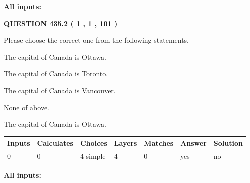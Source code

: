 \documentclass[12pt]{article}
\begin{document}
   
   
   
\noindent{}
   
   
   
   
\noindent\vspace{0.1in}\hspace{-0.08in} {\textbf{\Large{All inputs: }}}
   
   
  
\vspace{0.2in}
  
{\textbf{\Large{QUESTION
435.2 
 ( 1 , 1 , 101 )
}}}
  
  
Please choose the correct one from the following statements.
 
 
The capital of Canada is Ottawa.
 
 
The capital of Canada is Toronto.
 
 
The capital of Canada is Vancouver.
 
 
 None of above.
 
 
\noindent{}
 
 
The capital of Canada is Ottawa.
 
 
\noindent{}
 
 
   
   
   
   
\noindent\begin{tabular}{|l|l|l|l|l|l|l|}
 \hline
Inputs & Calculates & Choices & Layers & Matches & Answer & Solution \\ \hline
 0  & 
 0  & 
 4
  simple  
  & 
 4  & 
 0  & 
  yes & 
  no 
  \\ \hline
 \end{tabular}
   
   
   
   
\noindent{}
   
   
   
   
\noindent\vspace{0.1in}\hspace{-0.08in} {\textbf{\Large{All inputs: }}}
   
\end{document}
